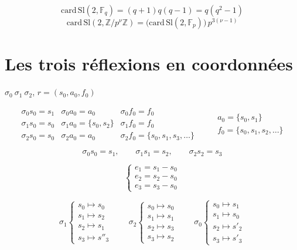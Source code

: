 \documentclass[11pt,a4paper]{article}
\begin{document}
\[
\mathrm{card}\,\mathrm{Sl}(2,\mathbb{F}_q) = (q+1)q(q-1) = q(q^2-1)
\]
\[
\mathrm{card}\,\mathrm{Sl}(2,\mathbb{Z}/p^\nu\mathbb{Z}) = \bigl(\mathrm{card}\,\mathrm{Sl}(2,\mathbb{F}_p)\bigr)\,p^{3(\nu-1)}
\]

\section{Les trois réflexions en coordonnées}

$\sigma_0\ \sigma_1\ \sigma_2$, \quad $r = (s_0, a_0, f_0)$

\[
\begin{array}{lll}
\sigma_0 s_0 = s_1 & \sigma_0 a_0 = a_0 & \sigma_0 f_0 = f_0 \\
\sigma_1 s_0 = s_0 & \sigma_1 a_0 = \{s_0, s_2\} & \sigma_1 f_0 = f_0 \\
\sigma_2 s_0 = s_0 & \sigma_2 a_0 = a_0 & \sigma_2 f_0 = \{s_0, s_1, s_3, \ldots\}
\end{array}
\qquad
\begin{array}{l}
a_0 = \{s_0, s_1\} \\
f_0 = \{s_0, s_1, s_2, \ldots\}
\end{array}
\]

\[
\sigma_0 s_0 = s_1, \qquad \sigma_1 s_1 = s_2, \qquad \sigma_2 s_2 = s_3
\]


\[
\begin{cases}
e_1 = s_1 - s_0 \\
e_2 = s_2 - s_0 \\
e_3 = s_3 - s_0
\end{cases}
\]

\[
\sigma_1 \begin{cases} s_0 \mapsto s_0 \\ s_1 \mapsto s_2 \\ s_2 \mapsto s_1 \\ s_3 \mapsto s''_3 \end{cases}
\qquad
\sigma_2 \begin{cases} s_0 \mapsto s_0 \\ s_1 \mapsto s_1 \\ s_2 \mapsto s_3 \\ s_3 \mapsto s_2 \end{cases}
\qquad
\sigma_0 \begin{cases} s_0 \mapsto s_1 \\ s_1 \mapsto s_0 \\ s_2 \mapsto s'_2 \\ s_3 \mapsto s'_3 \end{cases}
\]
\end{document}
